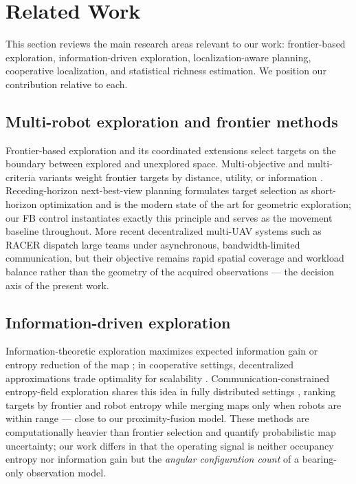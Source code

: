 \documentclass[journal]{IEEEtran}
\begin{document}
\section{Related Work}
This section reviews the main research areas relevant to our work:
frontier-based exploration, information-driven exploration,
localization-aware planning, cooperative localization, and statistical
richness estimation. We position our contribution relative to each.

\subsection{Multi-robot exploration and frontier methods}
Frontier-based exploration \cite{Yamauchi1997, Yamauchi1998} and its
coordinated extensions \cite{Burgard2005, Franchi2009} select targets on the
boundary between explored and unexplored space. Multi-objective and
multi-criteria variants weight frontier targets by distance, utility, or
information \cite{Gonzalez2002, BasilicoAmigoni2011}. Receding-horizon
next-best-view planning \cite{Bircher2016, Bircher2018} formulates target
selection as short-horizon optimization and is the modern state of the art for
geometric exploration; our FB control instantiates exactly this principle and
serves as the movement baseline throughout. More recent decentralized
multi-UAV systems such as RACER \cite{Zhou2023} dispatch large teams under
asynchronous, bandwidth-limited communication, but their objective remains
rapid spatial coverage and workload balance rather than the geometry of the
acquired observations --- the decision axis of the present work.

\subsection{Information-driven exploration}
Information-theoretic exploration maximizes expected information gain or
entropy reduction of the map \cite{Bourgault2002, Stachniss2005, Julian2014,
Charrow2015}; in cooperative settings, decentralized approximations trade
optimality for scalability \cite{Grocholsky2002, Ponda2012}.
Communication-constrained entropy-field exploration shares this idea in fully
distributed settings \cite{Pongsirijinda2025}, ranking targets by frontier and
robot entropy while merging maps only when robots are within range --- close
to our proximity-fusion model. These methods are computationally heavier than
frontier selection \cite{Grocholsky2002, Ponda2012, Lauri2023} and quantify
probabilistic map uncertainty; our work differs in that the operating signal is
neither occupancy entropy nor information gain but the \emph{angular
configuration count} of a bearing-only observation model.
\end{document}
